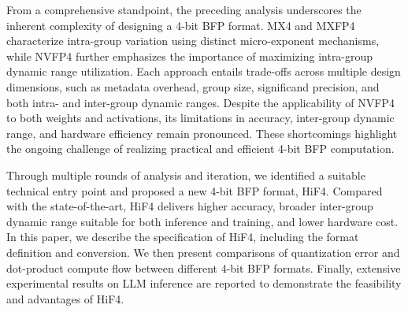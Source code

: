 From a comprehensive standpoint, the preceding analysis underscores the 
inherent complexity of designing a 4-bit BFP format. 
MX4 and MXFP4 characterize intra-group variation using distinct 
micro-exponent mechanisms, while NVFP4 further emphasizes the importance 
of maximizing intra-group dynamic range utilization. 
Each approach entails trade-offs across multiple design dimensions, 
such as metadata overhead, group size, significand precision, 
and both intra- and inter-group dynamic ranges. 
Despite the applicability of NVFP4 to both weights and activations, 
its limitations in accuracy, inter-group dynamic range, and hardware 
efficiency remain pronounced. 
These shortcomings highlight the ongoing challenge of realizing practical 
and efficient 4-bit BFP computation.

Through multiple rounds of analysis and iteration, 
we identified a suitable technical entry point and proposed a new 4-bit BFP 
format, HiF4. 
Compared with the state-of-the-art, HiF4 delivers higher accuracy, broader 
inter-group dynamic range suitable for both inference and training, 
and lower hardware cost. 
In this paper, we describe the specification of HiF4, including the format 
definition and conversion. 
We then present comparisons of quantization error and dot-product compute 
flow between different 4-bit BFP formats. 
Finally, extensive experimental results on LLM inference are 
reported to demonstrate the feasibility and advantages of HiF4.
